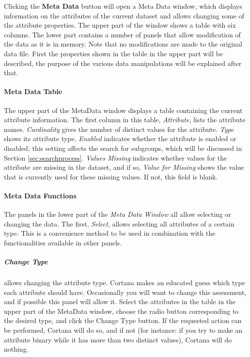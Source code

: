 \documentclass{article}
\begin{document}
Clicking the \textbf{Meta Data} button will open a Meta Data window, which
displays information on the attributes of the current dataset and allows
changing some of the attribute properties.  The upper part of the window
shows a table with six columns.  The lower part contains a number of panels
that allow modification of the data as it is in memory.  Note that no
modifications are made to the original data file.  First the properties
shown in the table in the upper part will be described, the purpose of the
various data manipulations will be explained after that.

\paragraph{Meta Data Table}
\label{meta-data-window:meta-data-table}

The upper part of the MetaData window displays a table containing the current
attribute information.  The first column in this table, \emph{Attribute},
lists the attribute names.  \emph{Cardinality} gives the number of distinct
values for the attribute.  \emph{Type} shows its attribute \gls{type}. 
\emph{Enabled} indicates whether the attribute is \gls{enabled} or
\gls{disabled}; this setting affects the search for subgroups, which will be
discussed in Section \ref{sec:searchprocess}.  \emph{Values Missing}
indicates whether values for the attribute are missing in the dataset, and
if so, \emph{Value for Missing} shows the value that is currently used for
these missing values.  If not, this field is blank.

\paragraph{Meta Data Functions}
\label{meta-data-window:meta-data-functions}

The panels in the lower part of the \emph{Meta Data Window} all allow
selecting or changing the data.  The first, \emph{Select}, allows selecting
all attributes of a certain type.  This is a convenience method to be used
in combination with the functionalities available in other panels.

\subparagraph{Change Type} allows changing the attribute \gls{type}.  Cortana
makes an educated guess which \gls{type} each attribute should have. 
Occasionally you will want to change this assessment, and if possible
this panel will allow it.  Select the attributes in the table in the upper
part of the MetaData window, choose the radio button corresponding to the
desired type, and click the Change Type button.  If the requested action can
be performed, Cortana will do so, and if not (for instance: if you try to
make an attribute binary while it has more than two distinct values),
Cortana will do nothing.
\end{document}
